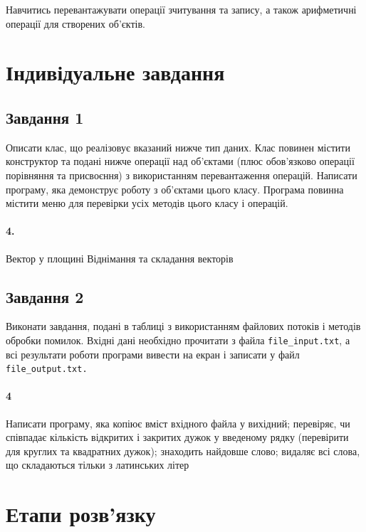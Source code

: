 \documentclass[a4paper, 12pt, oneside]{extarticle}
\begin{document}
\Margins



Навчитись перевантажувати операції зчитування та запису, а також
арифметичні операції для створених об’єктів.

\section*{Індивідуальне завдання}

\subsection*{Завдання 1}

Описати клас, що реалізовує вказаний нижче тип даних. Клас повинен
містити конструктор та подані нижче операції над об’єктами (плюс обов’язково
операції порівняння та присвоєння) з використанням перевантаження операцій.
Написати програму, яка демонструє роботу з об’єктами цього класу.
Програма повинна містити меню для перевірки усіх методів цього класу і
операцій.

\paragraph{4.}
Вектор у площині Віднімання та складання векторів

\subsection*{Завдання 2}

Виконати завдання, подані в таблиці з використанням файлових потоків і
методів обробки помилок.
Вхідні дані необхідно прочитати з файла \texttt{file\_input.txt}, а всі результати
роботи програми вивести на екран і записати у файл \texttt{file\_output.txt.}

\paragraph{4}
Написати програму, яка копіює вміст вхідного файла у вихідний; перевіряє, чи
співпадає кількість відкритих і закритих дужок у введеному рядку (перевірити для
круглих та квадратних дужок); знаходить найдовше слово; видаляє всі слова, що
складаються тільки з латинських літер

\section*{Етапи розв'язку}
\end{document}
